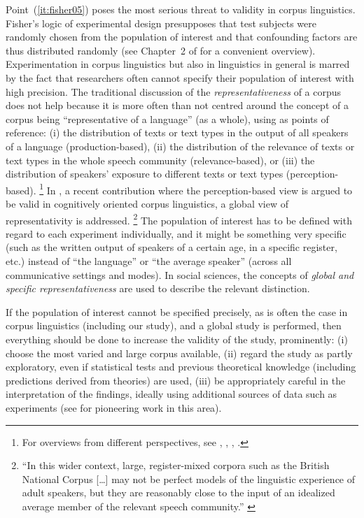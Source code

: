 Point~(\ref{it:fisher05}) poses the most serious threat to validity in corpus linguistics.
Fisher's logic of experimental design presupposes that test subjects were randomly chosen from the population of interest and that confounding factors are thus distributed randomly (see Chapter~2 of \citealt{MaxwellDelaney2004} for a convenient overview).
Experimentation in corpus linguistics but also in linguistics in general is marred by the fact that researchers often cannot specify their population of interest with high precision.
The traditional discussion of the \textit{representativeness} of a corpus does not help because it is more often than not centred around the concept of a corpus being ``representative of a language'' (as a whole), using as points of reference:
(i) the distribution of texts or text types in the output of all speakers of a language (production-based),
(ii) the distribution of the relevance of texts or text types in the whole speech community (relevance-based), or
(iii) the distribution of speakers' exposure to different texts or text types (perception-based).%
\footnote{For overviews from different perspectives, see \textcite{Biber1993}, \textcite{MceneryEa2006}, \textcite{Leech2007}, \textcite{Hunston2008}.}
In \textcite{StefanowitschFlach2016}, a recent contribution where the perception-based view is argued to be valid in cognitively oriented corpus linguistics, a global view of representativity is addressed.%
\footnote{``In this wider context, large, register-mixed corpora such as the British National Corpus [\ldots] may not be perfect models of the linguistic experience of adult speakers, but they are reasonably close to the input of an idealized average member of the relevant speech community.'' \parencite[104]{StefanowitschFlach2016}}
The population of interest has to be defined with regard to each experiment individually, and it might be something very specific (such as the written output of speakers of a certain age, in a specific register, etc.) instead of ``the language'' or ``the average speaker'' (across all communicative settings and modes).
In social sciences, the concepts of \textit{global and specific representativeness} \citep[86]{Bortz2005} are used to describe the relevant distinction.

If the population of interest cannot be specified precisely, as is often the case in corpus linguistics (including our study), and a global study is performed, then everything should be done to increase the validity of the study, prominently:
(i) choose the most varied and large corpus available,
(ii) regard the study as partly exploratory, even if statistical tests and previous theoretical knowledge (including predictions derived from theories) are used,
(iii) be appropriately careful in the interpretation of the findings, ideally using additional sources of data such as experiments (see \citealt{BresnanEa2007} for pioneering work in this area).

